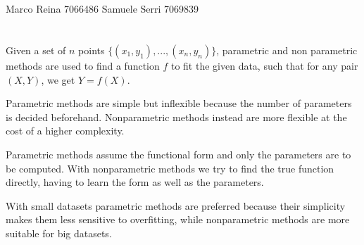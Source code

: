 \documentclass[12pt]{article}
\begin{document}
\section*{}
Marco Reina 7066486 \newline
Samuele Serri 7069839 \newline
\section*{}

Given a set of $n$ points $\{(x_1, y_1), ..., (x_n, y_n)\}$,
parametric and non parametric methods are used to find a function $f$ to fit the given data,
such that for any pair $(X,Y)$, we get $Y = f(X)$. \newline

Parametric methods are simple but inflexible because the number of parameters is decided beforehand.
Nonparametric methods instead are more flexible at the cost of a higher complexity. \newline

Parametric methods assume the functional form and only the parameters are to be computed.
With nonparametric methods we try to find the true function directly, having to learn the form as well as the parameters. \newline

With small datasets parametric methods are preferred
because their simplicity makes them less sensitive to overfitting,
while nonparametric methods are more suitable for big datasets.
\end{document}
